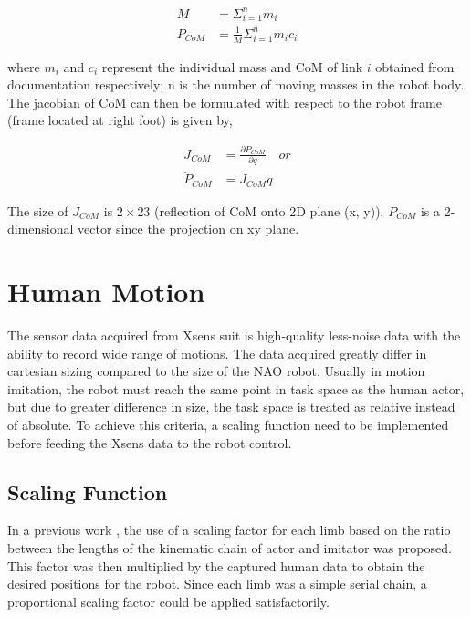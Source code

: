 \begin{align}
    \label{eq: robot-mass-com}
    M &= \Sigma_{i = 1}^n m_i \\
    P_{CoM} &= \frac{1}{M}\Sigma_{i = 1}^n m_ic_i
\end{align}

where $m_i$ and $c_i$ represent the individual mass and CoM of link $i$ obtained from documentation respectively; n is the number of moving masses 
in the robot body. The jacobian of CoM can then be formulated with respect to the robot frame (frame located at right foot) is given by,

\begin{align}
    \label{eq: robot-mass-com-2}
    J_{CoM} &= \frac{\partial P_{CoM}}{\partial q} \quad \mathit{or} \\
    \dot{P}_{CoM} &= J_{CoM} \dot{q}
\end{align}

The size of $J_{CoM}$ is $2 \times 23$ (reflection of CoM onto 2D plane (x, y)). $P_{CoM}$ is a 2-dimensional vector since the projection on xy plane.

\section{Human Motion}

The sensor data acquired from Xsens suit is high-quality less-noise data with the ability to record wide range of motions.
The data acquired greatly differ in cartesian sizing compared to the size of the NAO robot. Usually in motion imitation, the robot 
must reach the same point in task space as the human actor, but due to greater difference in size, the task space is treated as relative instead of absolute. 
To achieve this criteria, a scaling function need to be implemented before
feeding the Xsens data to the robot control.

\subsection*{Scaling Function}

In a previous work \cite{scaling-human-nao}, the use of a scaling factor for each limb based on the ratio between the lengths of the kinematic chain of actor and 
imitator was proposed. This factor was then multiplied by the captured human data to obtain the desired positions for the robot. Since each limb 
was a simple serial chain, a proportional scaling factor could be applied satisfactorily.

